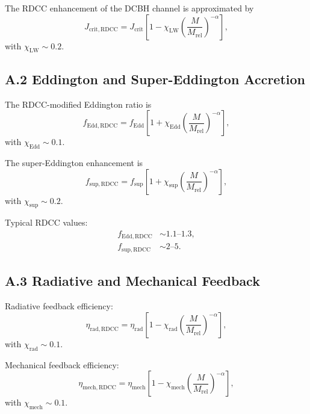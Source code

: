 \documentclass[11pt,a4paper]{article}
\begin{document}
The RDCC enhancement of the DCBH channel is approximated by
\begin{equation}
    J_{\mathrm{crit,RDCC}}
    = J_{\mathrm{crit}}
      \left[
        1 - \chi_{\mathrm{LW}}
        \left(\frac{M}{M_{\mathrm{rel}}}\right)^{-\alpha}
      \right],
\end{equation}
with $\chi_{\mathrm{LW}} \sim 0.2$.

\subsection*{A.2 Eddington and Super-Eddington Accretion}

The RDCC-modified Eddington ratio is
\begin{equation}
    f_{\mathrm{Edd,RDCC}}
    = f_{\mathrm{Edd}}
      \left[
        1 + \chi_{\mathrm{Edd}}
        \left(\frac{M}{M_{\mathrm{rel}}}\right)^{-\alpha}
      \right],
\end{equation}
with $\chi_{\mathrm{Edd}} \sim 0.1$.

The super-Eddington enhancement is
\begin{equation}
    f_{\mathrm{sup,RDCC}}
    = f_{\mathrm{sup}}
      \left[
        1 + \chi_{\mathrm{sup}}
        \left(\frac{M}{M_{\mathrm{rel}}}\right)^{-\alpha}
      \right],
\end{equation}
with $\chi_{\mathrm{sup}} \sim 0.2$.

Typical RDCC values:
\begin{align}
    f_{\mathrm{Edd,RDCC}} &\sim 1.1\text{--}1.3, \\
    f_{\mathrm{sup,RDCC}} &\sim 2\text{--}5.
\end{align}

\subsection*{A.3 Radiative and Mechanical Feedback}

Radiative feedback efficiency:
\begin{equation}
    \eta_{\mathrm{rad,RDCC}}
    = \eta_{\mathrm{rad}}
      \left[
        1 - \chi_{\mathrm{rad}}
        \left(\frac{M}{M_{\mathrm{rel}}}\right)^{-\alpha}
      \right],
\end{equation}
with $\chi_{\mathrm{rad}} \sim 0.1$.

Mechanical feedback efficiency:
\begin{equation}
    \eta_{\mathrm{mech,RDCC}}
    = \eta_{\mathrm{mech}}
      \left[
        1 - \chi_{\mathrm{mech}}
        \left(\frac{M}{M_{\mathrm{rel}}}\right)^{-\alpha}
      \right],
\end{equation}
with $\chi_{\mathrm{mech}} \sim 0.1$.
\end{document}
